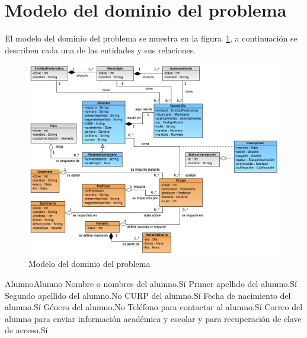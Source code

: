 \section{Modelo del dominio del problema}
\label{sec:hechosDeNegocio}


	El modelo del dominio del problema se muestra en la figura~\ref{fig:modeloDeDominio}, a continuación se describen cada una de las entidades y sus relaciones.
	
\begin{figure}[htpb!]
	\begin{center}
		\includegraphics[angle=90,width=.95\textwidth]{images/modeloDelDominioDelProblema}
		\caption{Modelo del dominio del problema}
		\label{fig:modeloDeDominio}
	\end{center}
\end{figure}

\begin{cdtEntidad}{Alumno}{Alumno}
		{Nombre o nombres del alumno.}{Sí}
		{Primer apellido del alumno.}{Sí}
		{Segundo apellido del alumno.}{No}
		{CURP del alumno.}{Sí}
		{Fecha de nacimiento del alumno.}{Sí}
		{Género del alumno.}{No}
		{Teléfono para contactar al alumno.}{Sí}
		{Correo del alumno para enviar información académica y escolar y para recuperación de clave de acceso.}{Sí}
	\cdtEntityRelSection
\end{cdtEntidad}

